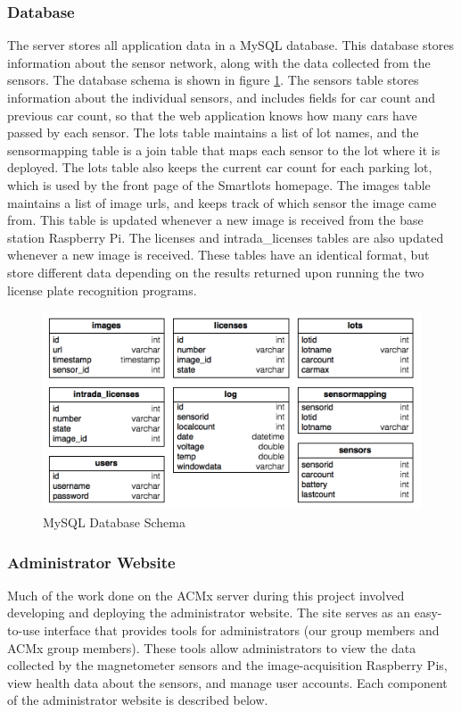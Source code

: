 \documentclass[11pt, oneside, fullpage, doublespace]{article}
\begin{document}
\subsubsection{Database}
The server stores all application data in a MySQL database. This database stores information about the sensor network, along with the data collected from the sensors. The database schema is shown in figure \ref{fig:schema}. The sensors table stores information about the individual sensors, and includes fields for car count and previous car count, so that the web application knows how many cars have passed by each sensor. The lots table maintains a list of lot names, and the sensormapping table is a join table that maps each sensor to the lot where it is deployed. The lots table also keeps the current car count for each parking lot, which is used by the front page of the Smartlots homepage. The images table maintains a list of image urls, and keeps track of which sensor the image came from. This table is updated whenever a new image is received from the base station Raspberry Pi. The licenses and intrada\_licenses tables are also updated whenever a new image is received. These tables have an identical format, but store different data depending on the results returned upon running the two license plate recognition programs.

\begin{figure}
\begin{center}
\includegraphics[width=5in]{schema}
\end{center}
\caption{MySQL Database Schema}
\label{fig:schema}
\end{figure}

\subsubsection{Administrator Website}
Much of the work done on the ACMx server during this project involved developing and deploying the administrator website. The site serves as an easy-to-use interface that provides tools for administrators (our group members and ACMx group members). These tools allow administrators to view the data collected by the magnetometer sensors and the image-acquisition Raspberry Pis, view health data about the sensors, and manage user accounts. Each component of the administrator website is described below.
\end{document}
